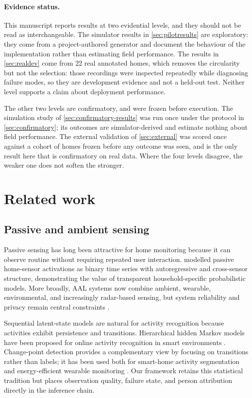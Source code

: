 \documentclass[11pt]{article}
\begin{document}
\paragraph{Evidence status.}
This manuscript reports results at two evidential levels, and they should not be
read as interchangeable. The simulator results in \cref{sec:pilotresults} are
exploratory: they come from a project-authored generator and document the
behaviour of the implementation rather than estimating field performance. The
results in \cref{sec:realdev} come from 22 real annotated homes, which removes
the circularity but not the selection: those recordings were inspected
repeatedly while diagnosing failure modes, so they are development evidence and
not a held-out test. Neither level supports a claim about deployment
performance.

The other two levels are confirmatory, and were frozen before execution. The
simulation study of \cref{sec:confirmatory-results} was run once under the
protocol in \cref{sec:confirmatory}; its outcomes are simulator-derived and
estimate nothing about field performance. The external validation of
\cref{sec:external} was scored once against a cohort of homes frozen before any
outcome was seen, and is the only result here that is confirmatory on real
data. Where the four levels disagree, the weaker one does not soften the
stronger.

\section{Related work}

\subsection{Passive and ambient sensing}

Passive sensing has long been attractive for home monitoring because it can observe routine without requiring repeated user interaction. \citet{gillam2022athome} modelled passive home-sensor activations as binary time series with autoregressive and cross-sensor structure, demonstrating the value of transparent household-specific probabilistic models. More broadly, AAL systems now combine ambient, wearable, environmental, and increasingly radar-based sensing, but system reliability and privacy remain central constraints \citep{zieni2025aal}.

Sequential latent-state models are natural for activity recognition because activities exhibit persistence and transitions. Hierarchical hidden Markov models have been proposed for online activity recognition in smart environments \citep{asghari2019hhmm}. Change-point detection provides a complementary view by focusing on transitions rather than labels; it has been used both for smart-home activity segmentation \citep{bermejo2021cpd} and energy-efficient wearable monitoring \citep{culman2020cpam}. Our framework retains this statistical tradition but places observation quality, failure state, and person attribution directly in the inference chain.
\end{document}
